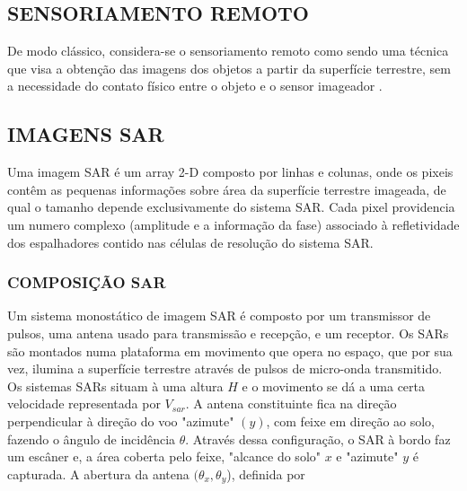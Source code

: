 \documentclass[a4paper,12pt]{article}
\begin{document}
\subsection{SENSORIAMENTO REMOTO}
\label{subsec:SR}

De modo clássico, considera-se o sensoriamento remoto como sendo uma técnica que visa a obtenção das imagens dos objetos a partir da superfície terrestre, sem a necessidade do contato físico entre o objeto e o sensor imageador \cite{evlyn1992}. \\


\subsection{IMAGENS SAR}
\label{subsecImg}
Uma imagem SAR é um array 2-D composto por linhas e colunas, onde os pixeis contêm as pequenas informações sobre área da superfície terrestre imageada, de qual o tamanho depende exclusivamente do sistema SAR. Cada pixel providencia um numero complexo (amplitude e a informação da fase) associado à refletividade dos espalhadores contido nas células de resolução do sistema SAR.\\

\subsubsection{COMPOSIÇÃO SAR}
\label{subsec:Cs}

Um sistema monostático de imagem SAR é composto por um transmissor de pulsos, uma antena usado para transmissão e recepção, e um receptor. Os SARs são montados numa plataforma em movimento que opera no espaço, que por sua vez, ilumina a superfície terrestre através de pulsos de micro-onda transmitido. Os sistemas SARs situam à uma altura $H$ e o movimento se dá a uma certa velocidade representada por $V_{sar}$. A antena constituinte fica na direção perpendicular à direção do voo "azimute" $(y)$, com feixe em direção ao solo, fazendo o ângulo de incidência $\theta$. Através dessa configuração, o SAR à bordo faz um escâner e, a área coberta pelo feixe, "alcance do solo" $x$ e "azimute" $y$ é capturada. A abertura da antena $(\theta_{x}, \theta_{y}$), definida por \\ 
\end{document}
